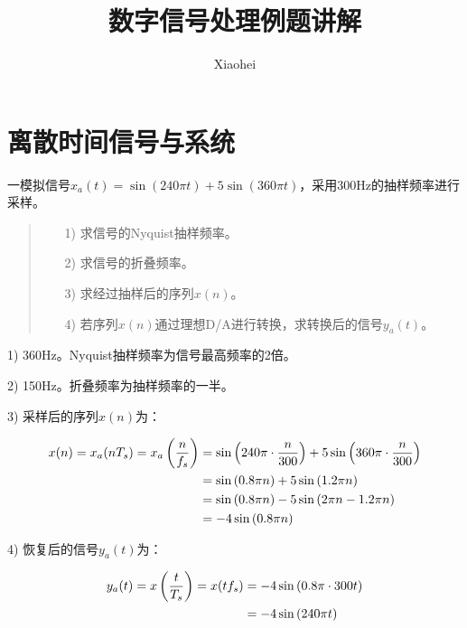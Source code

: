 \documentclass[cn, hazy, blue, normal, 14pt]{elegantnote}
\title{数字信号处理例题讲解}
\author{Xiaohei}
\date{\zhtoday}
\begin{document}
\maketitle

\setlength{\lineskip}{1em}
\setlength{\parskip}{0}


\section{离散时间信号与系统}


\begin{exercise}

一模拟信号$x_a(t)=\sin(240\pi t)+5\sin(360\pi t)$，采用300Hz的抽样频率进行采样。

\begin{quote}
\begin{itemize}
    \item[1)] 求信号的Nyquist抽样频率。
    \item[2)] 求信号的折叠频率。
    \item[3)] 求经过抽样后的序列$x(n)$。
    \item[4)] 若序列$x(n)$通过理想D/A进行转换，求转换后的信号$y_a(t)$。
\end{itemize}
\end{quote}

\end{exercise}

\begin{solution}[print=false]

1) 360Hz。Nyquist抽样频率为信号最高频率的2倍。

2) 150Hz。折叠频率为抽样频率的一半。

3) 采样后的序列$x(n)$为：

\begin{equation}
\notag
\begin{aligned}
    x(n)=x_a(nT_s)=x_a\left(\frac{n}{f_s}\right)&=\sin\left(240\pi\cdot\frac{n}{300}\right)+5\sin\left(360\pi\cdot\frac{n}{300}\right) \\
    &=\sin\left(0.8\pi n\right)+5\sin\left(1.2\pi n\right) \\
    &=\sin\left(0.8\pi n\right)-5\sin\left(2\pi n-1.2\pi n\right) \\
    &=-4\sin\left(0.8\pi n\right)
\end{aligned}
\end{equation}

4) 恢复后的信号$y_a(t)$为：

\begin{equation}
\notag
\begin{aligned}
    y_a(t)=x\left(\frac{t}{T_s}\right)=x(tf_s)&=-4\sin\left(0.8\pi \cdot 300 t\right) \\
    &=-4\sin\left(240\pi t\right)
\end{aligned}
\end{equation}

\end{solution}
\end{document}
